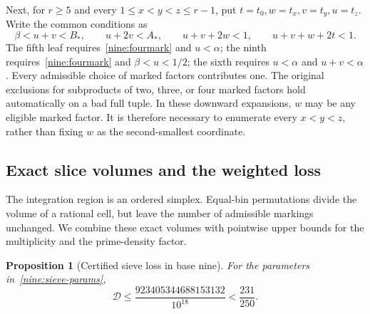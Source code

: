 \documentclass[11pt,a4paper]{article}
\theoremstyle{paperplain}
\newtheorem{proposition}[theorem]{Proposition}
\numberwithin{equation}{section}
\begin{document}
Next, for $r\ge5$ and every $1\le x<y<z\le r-1$, put
$t=t_0,w=t_x,v=t_y,u=t_z$. Write the common conditions as
\begin{equation}\label{nine:fourmark}
 \beta<u+v<B_*,\qquad u+2v<A_*,\qquad
 u+v+2w<1,\qquad u+v+w+2t<1.
\end{equation}
The fifth leaf requires~\eqref{nine:fourmark} and $u<\alpha$;
the ninth requires~\eqref{nine:fourmark} and $\beta<u<1/2$;
the sixth requires $u<\alpha$ and $u+v<\alpha$.
Every admissible choice of marked factors contributes one.
The original exclusions for subproducts of two, three, or four marked
factors hold automatically on a bad full tuple.
In these downward expansions, $w$ may be any eligible marked factor.
It is therefore necessary to enumerate every $x<y<z$, rather than fixing
$w$ as the second-smallest coordinate.

\subsection{Exact slice volumes and the weighted loss}

The integration region is an ordered simplex. Equal-bin permutations
divide the volume of a rational cell, but leave the number of admissible
markings unchanged. We combine these exact volumes with pointwise upper
bounds for the multiplicity and the prime-density factor.

\begin{proposition}[Certified sieve loss in base nine]\label{nine:certificate}
For the parameters in~\eqref{nine:sieve-params},
\begin{equation}\label{nine:certified-loss}
 \mathcal D\le\frac{923405344688153132}{10^{18}}<\frac{231}{250}.
\end{equation}
\end{proposition}
\end{document}
